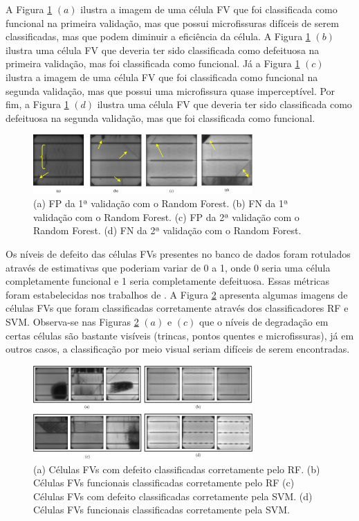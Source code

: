 \documentclass[a4paper]{ifacconf}
\begin{document}
A Figura \ref{fig:08} $(a)$ ilustra a imagem de uma célula FV que foi classificada como funcional na primeira validação, mas que possui microfissuras difíceis de serem classificadas, mas que podem diminuir a eficiência da célula. A Figura \ref{fig:08} $(b)$ ilustra uma célula FV que deveria ter sido classificada como defeituosa na primeira validação, mas foi classificada como funcional. Já a Figura \ref{fig:08} $(c)$ ilustra a imagem de uma célula FV que foi classificada como funcional na segunda validação, mas que possui uma microfissura quase imperceptível. Por fim, a Figura \ref{fig:08} $(d)$ ilustra uma célula FV que deveria ter sido classificada como defeituosa na segunda validação, mas que foi classificada como funcional.

\begin{figure}[hbt!]
\begin{center}
\includegraphics[width=8.4cm]{imgs/Fig08.png}    %
\caption{(a) FP da 1ª validação com o  Random Forest. (b) FN da 1ª validação com o Random Forest. (c) FP da 2ª validação com o Random Forest. (d) FN da 2ª validação com o Random Forest.} 
\label{fig:08}
\end{center}
\end{figure}

Os níveis de defeito das células FVs presentes no banco de dados foram rotulados através de estimativas que poderiam variar de 0 a 1, onde 0 seria uma célula completamente funcional e 1 seria completamente defeituosa. Essas métricas foram estabelecidas nos trabalhos de \citep{Deitsch2018, Buerhop2018, Deitsch2019}. A Figura \ref{fig:09} apresenta algumas imagens de células FVs que foram classificadas corretamente através dos classificadores RF e SVM. Observa-se nas Figuras \ref{fig:09} $(a)$ e $(c)$ que o níveis de degradação em certas células são bastante visíveis (trincas, pontos quentes e microfissuras), já em outros casos, a classificação por meio visual seriam difíceis de serem encontradas. 

\begin{figure}[hbt!]
\begin{center}
\includegraphics[width=8.4cm]{imgs/Fig09.png}    %
\caption{(a) Células FVs com defeito classificadas corretamente pelo RF. (b) Células FVs funcionais classificadas corretamente pelo RF (c) Células FVs com defeito classificadas corretamente pela SVM. (d) Células FVs funcionais classificadas corretamente pela SVM.} 
\label{fig:09}
\end{center}
\end{figure}
\end{document}
